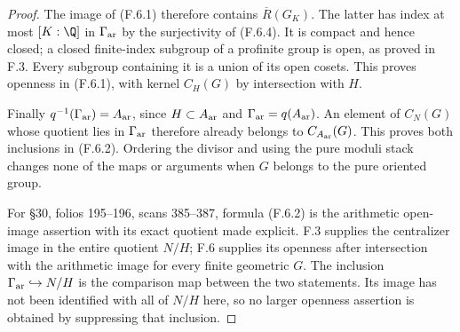 \begin{proof}
The image of (F.6.1) therefore contains
$\overline R(G_K)$.  The latter has index at most
$[K:\Q]$ in $\Gamma_{\rm ar}$ by the surjectivity of
(F.6.4).  It is compact and hence closed; a closed finite-index
subgroup of a profinite group is open, as proved in F.3.
Every subgroup containing it is a union of its open cosets.
This proves openness in (F.6.1), with kernel $C_H(G)$ by
intersection with $H$.

Finally $q^{-1}(\Gamma_{\rm ar})=A_{\rm ar}$, since
$H\subset A_{\rm ar}$ and $\Gamma_{\rm ar}=q(A_{\rm ar})$.
An element of $C_N(G)$ whose quotient lies in $\Gamma_{\rm ar}$
therefore already belongs to $C_{A_{\rm ar}}(G)$.
This proves both inclusions in (F.6.2).  Ordering the divisor
and using the pure moduli stack changes none of the maps or
arguments when $G$ belongs to the pure oriented group.

For \S30, folios 195--196, scans 385--387, formula (F.6.2)
is the arithmetic open-image assertion with its exact
quotient made explicit.  F.3 supplies the centralizer image
in the entire quotient $N/H$; F.6 supplies its openness
after intersection with the arithmetic image for every
finite geometric $G$.  The inclusion
$\Gamma_{\rm ar}\hookrightarrow N/H$ is the comparison
map between the two statements.  Its image has not been
identified with all of $N/H$ here, so no larger openness
assertion is obtained by suppressing that inclusion.
\end{proof}
